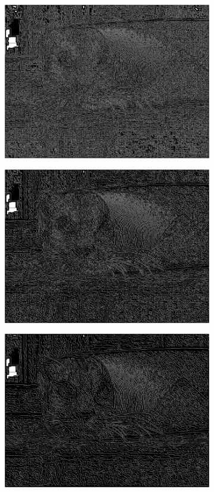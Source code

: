 \documentclass[a4paper]{article}
\begin{document}
\begin{figure}[h]
\begin{subfigure}{0.33\textwidth}
\includegraphics[width=\textwidth]{img/sigma1/catnon.png}
\end{subfigure}
\begin{subfigure}{0.33\textwidth}
\includegraphics[width=\textwidth]{img/sigma2/catnon.png}
\end{subfigure}
\begin{subfigure}{0.33\textwidth}
\includegraphics[width=\textwidth]{img/sigma3/catnon.png}

\end{subfigure}
\end{figure}
\end{document}
